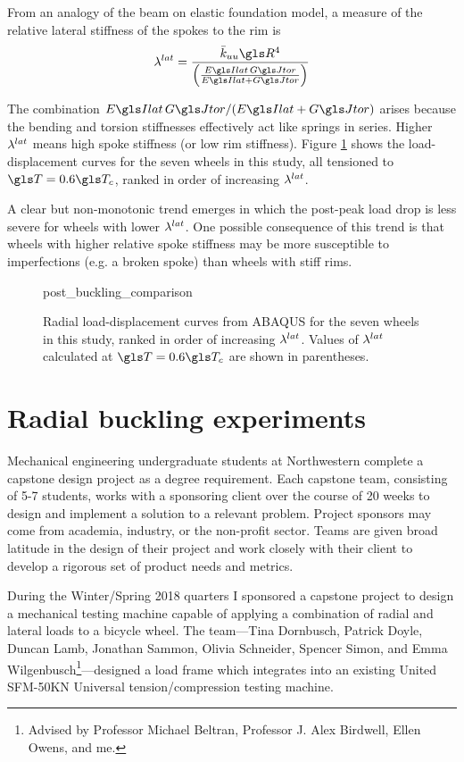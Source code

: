\documentclass[\rootdir/thesis.tex]{subfiles}
\begin{document}
From an analogy of the beam on elastic foundation model, a measure of the relative lateral stiffness of the spokes to the rim is
\begin{equation}
\lr^{lat} = \frac{\kuu \R^4}{\left(\frac{\EIl\,\GJ}{\EIl+\GJ}\right)}
\end{equation}

The combination $\EIl\,\GJ/(\EIl+\GJ)$ arises because the bending and torsion stiffnesses effectively act like springs in series. Higher $\lambda^{lat}$ means high spoke stiffness (or low rim stiffness). Figure \ref{fig:post_buckling_comparison} shows the load-displacement curves for the seven wheels in this study, all tensioned to $\T=0.6\T_c$, ranked in order of increasing $\lambda^{lat}$.

A clear but non-monotonic trend emerges in which the post-peak load drop is less severe for wheels with lower $\lambda^{lat}$. One possible consequence of this trend is that wheels with higher relative spoke stiffness may be more susceptible to imperfections (e.g. a broken spoke) than wheels with stiff rims.

\begin{figure}[t]
\centering
{post_buckling_comparison}
\caption[Post-buckling behavior under radial load]{Radial load-displacement curves from ABAQUS for the seven wheels in this study, ranked in order of increasing $\lambda^{lat}$. Values of $\lambda^{lat}$ calculated at $\T=0.6\T_c$ are shown in parentheses.}
\label{fig:post_buckling_comparison}
\end{figure}

\section{Radial buckling experiments}

Mechanical engineering undergraduate students at Northwestern complete a capstone design project as a degree requirement. Each capstone team, consisting of 5-7 students, works with a sponsoring client over the course of 20 weeks to design and implement a solution to a relevant problem. Project sponsors may come from academia, industry, or the non-profit sector. Teams are given broad latitude in the design of their project and work closely with their client to develop a rigorous set of product needs and metrics.

During the Winter/Spring 2018 quarters I sponsored a capstone project to design a mechanical testing machine capable of applying a combination of radial and lateral loads to a bicycle wheel. The team---Tina Dornbusch, Patrick Doyle, Duncan Lamb, Jonathan Sammon, Olivia Schneider, Spencer Simon, and Emma Wilgenbusch\footnote{Advised by Professor Michael Beltran, Professor J. Alex Birdwell, Ellen Owens, and me.}---designed a load frame which integrates into an existing United SFM-50KN Universal tension/compression testing machine.
\end{document}
